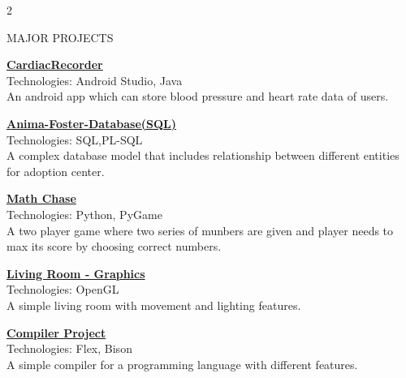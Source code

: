 \documentclass{resume} %
\begin{document}
\begin{paracol}{2}
\begin{rSection}{MAJOR PROJECTS}
\color{blue}
\item \href{https://github.com/mashfi40/CardiacRecorder}{\textbf{CardiacRecorder}}
\color{black}
\\{Technologies: Android Studio, Java} \\
{An android app which can store blood pressure and heart rate data of users.}
\color{blue}
\item \href{https://github.com/DatabaseSystem19/database-project-mashfi40}{\textbf{Anima-Foster-Database(SQL)}}
\color{black}
\\{Technologies: SQL,PL-SQL} \\
{A complex database model that includes relationship between different entities for adoption center.}
\color{blue}
\item \href{https://github.com/Rafia06/Math-Chase-AI-project}{\textbf{Math Chase}}
\color{black}
\\{Technologies: Python, PyGame} \\
{A two player game where two series of munbers are given and player needs to max its score by choosing correct numbers.}
\color{blue}
\item \href{https://github.com/mashfi40/living-room-openGL}{\textbf{Living Room - Graphics}}
\color{black}
\\{Technologies: OpenGL} \\
{A simple living room with movement and lighting features.}
\color{blue}
\item \href{https://github.com/mashfi40/compiler-project}{\textbf{Compiler Project}}
\color{black}
\\{Technologies: Flex, Bison} \\
{A simple compiler for a programming language with different features.}
\end{rSection} 
\vspace{0.5em}
\end{paracol}





\end{document}
